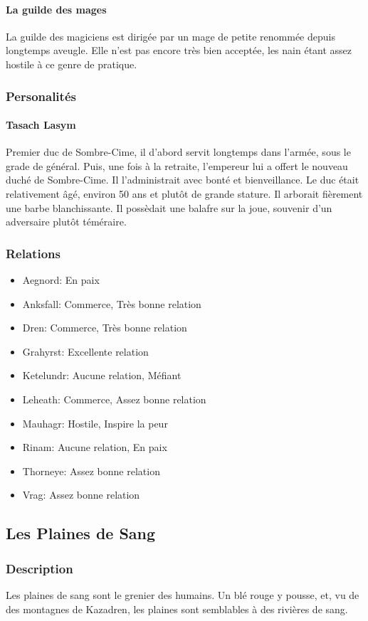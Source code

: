 \paragraph{La guilde des mages}
La guilde des magiciens est dirigée par un mage de petite renommée depuis longtemps aveugle. Elle n’est pas encore très bien acceptée, les nain étant assez hostile à ce genre de pratique. 
\subsubsection{Personalités}
\paragraph{Tasach Lasym}
Premier duc de Sombre-Cime, il d'abord servit longtemps dans l'armée, sous le grade de général.
Puis, une fois à la retraite, l'empereur lui a offert le nouveau duché de Sombre-Cime.
Il l'administrait avec bonté et bienveillance.
Le duc était relativement âgé, environ 50 ans et plutôt de grande stature.
Il arborait fièrement une barbe blanchissante.
Il possèdait une balafre sur la joue, souvenir d'un adversaire plutôt téméraire.
\subsubsection{Relations}
\begin{itemize}
\item Aegnord: En paix 
\item Anksfall: Commerce, Très bonne relation 
\item Dren: Commerce, Très bonne relation 
\item Grahyrst: Excellente relation  
\item Ketelundr: Aucune relation, Méfiant
\item Leheath: Commerce, Assez bonne relation 
\item Mauhagr: Hostile, Inspire la peur 
\item Rinam: Aucune relation, En paix 
\item Thorneye: Assez bonne relation 
\item Vrag: Assez bonne relation 
\end{itemize} 
\subsection{Les Plaines de Sang}
\subsubsection{Description}
\hypertarget{lesplainesdesang}{}
Les plaines de sang sont le grenier des humains. Un blé rouge y pousse, et, vu de des montagnes de Kazadren, les plaines sont semblables à des rivières de sang.

